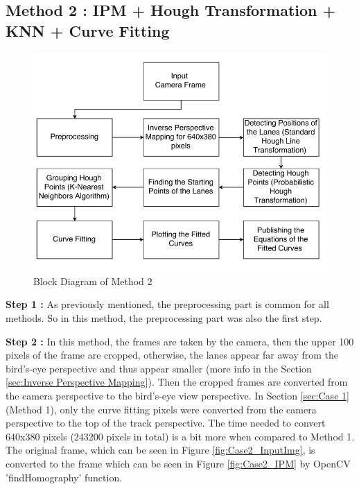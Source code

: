 \subsection{Method 2 : IPM + Hough Transformation + KNN + Curve Fitting}\label{sec:Case 2}

\begin{figure}[H]
 \centering
  \includegraphics[width=1\textwidth]{./Bilder/Case2_BlockDiagram.png}
	\caption{Block Diagram of Method 2}
	\label{fig:Case2_BlockDiagram}
\end{figure}

\textbf{Step 1 : }As previously mentioned, the preprocessing part is common for all methods. So in this method, the preprocessing part was also the first step.

\textbf{Step 2 : }In this method, the frames are taken by the camera, then the upper 100 pixels of the frame are cropped, otherwise, the lanes appear far away from the bird's-eye perspective and thus appear smaller (more info in the Section \ref{sec:Inverse Perspective Mapping}). Then the cropped frames are converted from the camera perspective to the bird's-eye view perspective. In Section \ref{sec:Case 1} (Method 1), only the curve fitting pixels were converted from the camera perspective to the top of the track perspective. The time needed to convert 640x380 pixels (243200 pixels in total) is a bit more when compared to Method 1. The original frame, which can be seen in Figure \ref{fig:Case2_InputImg}, is converted to the frame which can be seen in Figure \ref{fig:Case2_IPM} by OpenCV 'findHomography' function.

